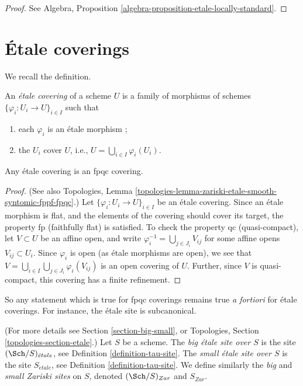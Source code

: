 \begin{proof}
See
Algebra, Proposition \ref{algebra-proposition-etale-locally-standard}.
\end{proof}





\section{\'Etale coverings}
\label{section-etale-covering}

\noindent
We recall the definition.

\begin{definition}
\label{definition-etale-covering}
An {\it \'etale covering} of a scheme $U$ is a family of morphisms
of schemes
$\{\varphi_i : U_i \to U\}_{i \in I}$ such that
\begin{enumerate}
\item each $\varphi_i$ is an \'etale morphism ;
\item the $U_i$ cover $U$, i.e., $U = \bigcup_{i\in I}\varphi_i(U_i)$.
\end{enumerate}
\end{definition}

\begin{lemma}
\label{lemma-etale-fpqc}
Any \'etale covering is an fpqc covering.
\end{lemma}

\begin{proof}
(See also
Topologies,
Lemma \ref{topologies-lemma-zariski-etale-smooth-syntomic-fppf-fpqc}.)
Let $\{\varphi_i : U_i \to U\}_{i \in I}$ be an \'etale covering.
Since an \'etale morphism is flat, and the elements of the covering should
cover its target, the property fp (faithfully flat) is satisfied.
To check the property qc (quasi-compact), let $V \subset U$ be an affine
open, and write $\varphi_i^{-1} = \bigcup_{j \in J_i} V_{ij}$
for some affine opens $V_{ij} \subset U_i$. Since $\varphi_i$ is open
(as \'etale morphisms are open), we see that
$V = \bigcup_{i\in I} \bigcup_{j \in J_i} \varphi_i(V_{ij})$
is an open covering of $U$.
Further, since $V$ is quasi-compact, this covering has a finite
refinement.
\end{proof}

\noindent
So any statement which is true for fpqc coverings
remains true {\it a fortiori} for \'etale coverings. For
instance, the \'etale site is subcanonical.

\begin{definition}
\label{definition-big-etale-site}
(For more details see Section \ref{section-big-small}, or
Topologies, Section \ref{topologies-section-etale}.)
Let $S$ be a scheme.
The {\it big \'etale site over $S$} is the site
$(\Sch/S)_{\acute{e}tale}$, see
Definition \ref{definition-tau-site}.
The {\it small \'etale site over $S$} is the site $S_{\acute{e}tale}$, see
Definition \ref{definition-tau-site}.
We define similarly the {\it big} and {\it small Zariski sites} on $S$,
denoted $(\Sch/S)_{Zar}$ and $S_{Zar}$.
\end{definition}

